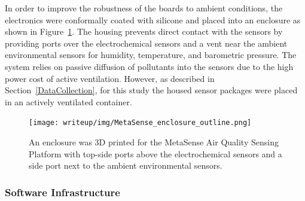 \documentclass[journal abbreviation, manuscript]{copernicus}
\begin{document}
In order to improve the robustness of the boards to ambient conditions, the electronics were conformally coated with silicone and placed into an enclosure as shown in Figure~\ref{fig:img-enclosure}. The housing prevents direct contact with the sensors by providing ports over the electrochemical sensors and a vent near the ambient environmental sensors for humidity, temperature, and barometric pressure. The system relies on passive diffusion of pollutants into the sensors due to the high power cost of active ventilation.  However, as described in Section~\ref{DataCollection}, for this study the housed sensor packages were placed in an actively ventilated container.



\begin{figure}[t]
\centering
\texttt{[image: writeup/img/MetaSense\_enclosure\_outline.png]}
\caption{An enclosure was 3D printed for the MetaSense Air Quality Sensing Platform with top-side ports above the electrochemical sensors and a side port next to the ambient environmental sensors.}
\label{fig:img-enclosure}
\end{figure}

\subsubsection{Software Infrastructure}

\end{document}
